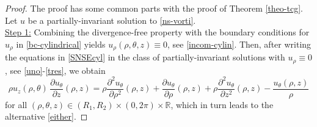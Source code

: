 \documentclass[a4paper,11pt]{amsart}
\numberwithin{equation}{section}
\numberwithin{figure}{section}
\begin{document}
	\begin{proof}
		The proof has some common parts with the proof of Theorem \ref{theo-tcg}.
		Let $u$ be a partially-invariant solution to \eqref{ns-vorti}.  \\
		\underline{Step 1:} Combining the divergence-free property with the boundary conditions for $u_\rho$ in \eqref{bc-cylindrical} yields $u_\rho(\rho, \theta, z)\equiv 0 $, see \eqref{incom-cylin}.
		Then, after writing the equations in \eqref{SNSEcyl} in the class of partially-invariant solutions with $u_\rho\equiv 0$, see \eqref{uno}-\eqref{tres},  we obtain
		\begin{equation}\label{sinB-2}
			\rho u_z(\rho,\theta)\, \frac{\partial u_{\theta}}{\partial z}(\rho,z)=\rho\frac{\partial^2 u_{\theta}}{\partial\rho^2}(\rho,z) +
			\frac{\partial u_{\theta}}{\partial\rho}(\rho,z)+\rho\frac{\partial^2u_{\theta}}{\partial z^2}(\rho,z)-\frac{u_\theta(\rho,z)}{\rho}
		\end{equation}for all $(\rho, \theta, z)\in(R_1,R_2)\times (0, 2\pi)\times \mathbb{R}$,
		which in turn leads to the alternative \eqref{either}.
		

\end{proof}
\end{document}
